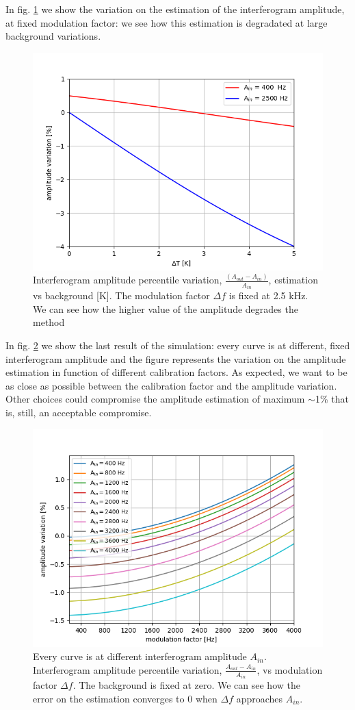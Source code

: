 \documentclass[twocolumn,traditabstract]{aa}\\
\begin{document}
\noindent In fig. \ref{fig:amp_bck} we show the variation on the estimation of the interferogram amplitude, at fixed modulation factor: we see how this estimation is degradated at large background variations.

\begin{figure}[htf]
	\centering
	\includegraphics[width=.5\textwidth]{3.acqui/amplitude_variation.png}
	\caption{Interferogram amplitude percentile variation, $\frac{(A_{out}-A_{in})}{A_{in}}$, estimation vs background [K]. The modulation factor $\Delta f$ is fixed at 2.5 kHz. We can see how the higher value of the amplitude degrades the method}
	\label{fig:amp_bck}
\end{figure}

\noindent In fig. \ref{fig:amp_mod} we show the last result of the simulation: every curve is at different, fixed interferogram amplitude and the figure represents the variation on the amplitude estimation in function of different calibration factors. As expected, we want to be as close as possible between the calibration factor and the amplitude variation. Other choices could compromise the amplitude estimation of maximum $\sim$1\% that is, still, an acceptable compromise.

\begin{figure}[htf]
	\centering
	\includegraphics[width=.5\textwidth]{3.acqui/several_modulations.png}
	\caption{Every curve is at different interferogram amplitude $A_{in}$. Interferogram amplitude percentile variation, $\frac{A_{out}-A_{in}}{A_{in}}$, vs modulation factor $\Delta f$.  The background is fixed at zero. We can see how the error on the estimation converges to 0 when $\Delta f$ approaches $A_{in}$. }
	\label{fig:amp_mod}
\end{figure}
\end{document}
